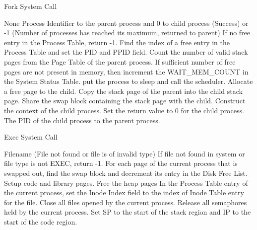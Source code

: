 

\begin{algorithm}
\caption{Fork System Call}
\begin{algorithmic}
\REQUIRE None
\ENSURE Process Identifier to the parent process and 0 to child process (Success) or -1 (Number of processes has reached its maximum, returned to parent)
\STATE If no free entry in the Process Table, return -1.  
\STATE Find the index of a free entry in the Process Table and set the PID and PPID field.   
\STATE Count the number of valid stack pages from the Page Table of the parent process.   
\STATE If sufficient number of free pages are not present in memory, then increment the WAIT\_MEM\_COUNT in the System Status Table.
    \STATE put the process to sleep and call the scheduler.
\ENDWHILE
{}
        \STATE Allocate a free page to the child.
        \STATE Copy the stack page of the parent into the child stack page.
        \ELSE 
            \STATE Share the swap block containing the stack page with the child.
    \ENDIF
\ENDFOR
\STATE Construct the context of the child process.
\STATE Set the return value to 0 for the child process.
\RETURN The PID of the child process to the parent process.

\end{algorithmic}
\end{algorithm}


\begin{algorithm}
\caption{Exec System Call}
\begin{algorithmic}
\REQUIRE Filename
 (File not found or file is of invalid type)
\STATE If file not found in system or file type is not EXEC, return -1. \STATE For each page of the current process that is swapped out, find the swap block and decrement its entry in the Disk Free List. 
\STATE Setup code and library pages.
\STATE Free the heap pages
\STATE In the Process Table entry of the current process, set the Inode Index field to the index of Inode Table entry for the file.
\STATE Close all files opened by the current process.     
\STATE Release all semaphores held by the current process.   
\STATE Set SP to the start of the stack region and IP to the start of the code region. 
\RETURN
\end{algorithmic}
\end{algorithm}

